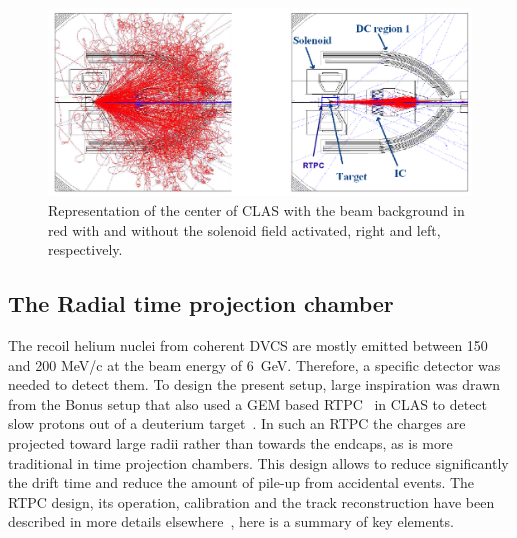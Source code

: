 \documentclass[aps,prc,preprint,superscriptaddress]{revtex4}
\begin{document}
\begin{figure}[tbp!]
\center
\includegraphics[width=14cm]{fig3/solenoid.png}
\caption{Representation of the center of CLAS with the beam background in red with and without
	the solenoid field activated, right and left, respectively.}
\label{fig:Solenoid}
\end{figure}


\subsection{The Radial time projection chamber}

The recoil helium nuclei from coherent DVCS are mostly emitted between 150 
and 200 MeV/c at the beam energy of 6~GeV. Therefore, a specific detector was 
needed to detect them. To design the present setup, large inspiration was drawn from the 
Bonus setup that also used a GEM based RTPC~\cite{Fenker:2008zz} in CLAS to 
detect slow protons out of a deuterium target~\cite{Baillie:2011za}. In such an RTPC the 
charges are projected toward large radii 
rather than towards the endcaps, as is more traditional in time 
projection chambers. This design allows to reduce significantly the drift time and reduce the 
amount of pile-up from accidental events. The RTPC design, its operation, calibration and 
the track reconstruction have been described in more 
details elsewhere~\cite{Dupre:2017upj}, here is a summary of key elements.
\end{document}
